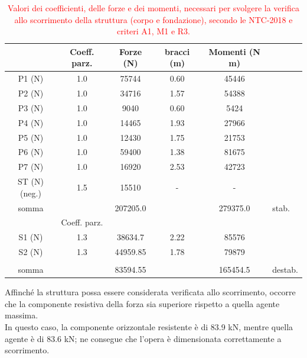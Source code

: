 \begin{table}[H] \centering
    \caption{\textcolor{red}{Valori dei coefficienti, delle forze e dei momenti, necessari per svolgere la verifica allo scorrimento della struttura (corpo e fondazione), secondo le NTC-2018 e criteri A1, M1 e R3.}}
    \begin{tabular}{cccccl}
\toprule
& Coeff. parz. & Forze (N) & bracci (m) & Momenti (N m) &         \\
\midrule
    P1 (N) & 1.0  & 75744              & 0.60       & 45446 &         \\
    P2 (N) & 1.0  & 34716 & 1.57       & 54388         &         \\
    P3 (N)        & 1.0    & 9040               & 0.60       & 5424 &\\
    P4 (N)        & 1.0 & 14465 & 1.93  & 27966                  & \\
    P5 (N)        & 1.0                & 12430 & 1.75 & 21753    & \\
    P6 (N)        & 1.0   & 59400              & 1.38       & 81675  & \\
    P7 (N)        & 1.0 & 16920 & 2.53       & 42723         & \\
    ST (N) (neg.) & 1.5                & 15510  & -          & -   & \\
    somma         &        & 207205.0   &  & 279375.0  & stab. \\
    \midrule
    & Coeff. parz. & &   &                        &         \\
    S1 (N)        & 1.3 & 38634.7 & 2.22 & 85576                  & \\
    S2 (N)        & 1.3 & 44959.85 & 1.78       & 79879     &         \\
       &       &   & &      &         \\
    somma & & 83594.55  &    & 165454.5               & destab. \\
    \bottomrule
    \end{tabular}
    \end{table}

Affinché la struttura possa essere considerata verificata allo scorrimento, occorre che la componente resistiva della forza sia superiore rispetto a quella agente massima.\\
In questo caso, la componente orizzontale resistente è di 83.9 kN, mentre quella agente è di 83.6 kN; ne consegue che l'opera è dimensionata correttamente a scorrimento.\\

